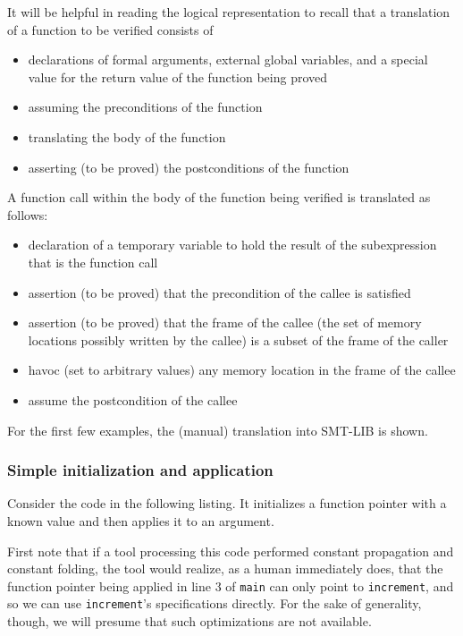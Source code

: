 It will be helpful in reading the logical representation to recall that
a translation of a function to be verified consists of
\begin{itemize}[noitemsep,nolistsep]
	\item declarations of formal arguments, external global variables, and a special value for the return value of the function being proved
	\item assuming the preconditions of the function
	\item translating the body of the function
	\item asserting (to be proved) the postconditions of the function
\end{itemize}
A function call within the body of the function being verified is
translated as follows:
\begin{itemize}[noitemsep,nolistsep]
	\item declaration of a temporary variable to hold the result of the subexpression that is the function call
	\item assertion (to be proved) that the precondition of the callee is satisfied
	\item assertion (to be proved) that the frame of the callee (the set of memory locations possibly written by the callee) is a subset of the frame of the caller
	\item havoc (set to arbitrary values) any memory location in the frame of the callee
	\item assume the postcondition of the callee
\end{itemize}

For the first few examples, the (manual) translation into SMT-LIB is shown.

\subsubsection{Simple initialization and application}

Consider the code in the following listing. It initializes a function pointer with a known value and then applies it to an argument.


First note that if a tool processing this code performed constant propagation and constant folding, the tool would realize, as a human immediately does, that the function 
pointer being applied in line 3 of \lstinline|main| can only point to 
\lstinline|increment|, and so we can use \lstinline|increment|'s specifications directly.
For the sake of generality, though, we will presume that such 
optimizations are not available.


